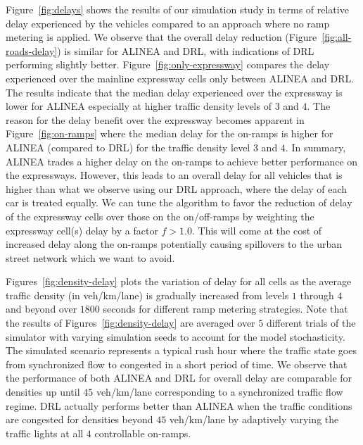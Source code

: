 \documentclass[conference]{IEEEtran}
\begin{document}
Figure~\ref{fig:delays} shows the results of our simulation study in terms of relative delay experienced by the vehicles compared to an approach where no ramp metering is applied.
We observe that the overall delay reduction (Figure~\ref{fig:all-roads-delay}) is similar for ALINEA and \ac{DRL}, with indications of \ac{DRL} performing slightly better.
Figure~\ref{fig:only-expressway} compares the delay experienced over the mainline expressway cells only between ALINEA and \ac{DRL}.
The results indicate that the median delay experienced over the expressway is lower for ALINEA especially at higher traffic density levels of $3$ and $4$.
The reason for the delay benefit over the expressway becomes apparent in Figure~\ref{fig:on-ramps} where  the median delay for the on-ramps is higher for ALINEA (compared to \ac{DRL}) for the traffic density level $3$ and $4$.
In summary, ALINEA trades a higher delay on the on-ramps to achieve better performance on the expressways.
However, this leads to an overall delay for all vehicles that is higher than what we observe using our \ac{DRL} approach, where the delay of each car is treated equally.
We can tune the algorithm to favor the reduction of delay of the expressway cells  over those on the on/off-ramps by weighting the expressway cell(s) delay by a factor $f>1.0$. This will come at the cost of increased delay along the on-ramps potentially causing spillovers to the urban street network which we want to avoid.%


Figures~\ref{fig:density-delay} plots the variation of delay for all cells as the average traffic density (in veh/km/lane) is gradually increased from  levels $1$ through $4$ and beyond over $1800$ seconds for different ramp metering strategies. Note that the results of Figures~\ref{fig:density-delay} are averaged over $5$ different trials of the simulator with varying simulation seeds to account for the model stochasticity. The simulated scenario represents a typical rush hour  where the traffic state goes from synchronized flow to congested in a short period of time. We observe that the performance of both ALINEA and \ac{DRL} for overall delay are comparable for densities up until $45$ veh/km/lane corresponding to a synchronized traffic flow regime. \ac{DRL} actually performs better than ALINEA when the traffic conditions are congested for densities beyond $45$ veh/km/lane by adaptively varying the traffic lights at all $4$ controllable on-ramps.
\end{document}
